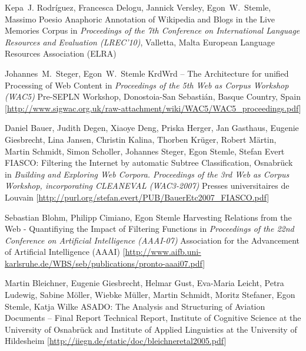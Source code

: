 \documentclass[11pt,a4paper]{moderncv}
\begin{document}
        {Kepa~J. Rodr{\'i}guez, Francesca Delogu, Jannick Versley,
        Egon~W.~Stemle, Massimo Poesio} {Anaphoric Annotation of Wikipedia
        and Blogs in the Live Memories Corpus}
        {\small in {\em Proceedings of the 7th Conference on International
        Language Resources and Evaluation (LREC'10)}, Valletta, Malta}
        {\small European Language Resources Association (ELRA)}
        {}

        {Johannes~M.~Steger, Egon~W.~Stemle}
        {{KrdWrd} -- The Architecture for unified Processing of Web Content}
        {\small in {\em Proceedings of the 5th Web as Corpus Workshop (WAC5)}}
        {\small Pre-SEPLN Workshop, Donostoia-San Sebasti{\'a}n, Basque
        Country, Spain}
        {[\url{http://www.sigwac.org.uk/raw-attachment/wiki/WAC5/WAC5_proceedings.pdf}]}

        {Daniel Bauer, Judith Degen, Xiaoye Deng, Priska Herger, Jan Gasthaus,
        Eugenie Giesbrecht, Lina Jansen, Christin Kalina, Thorben Kr{\"u}ger,
        Robert M{\"a}rtin, Martin Schmidt, Simon Scholler, Johannes Steger,
        Egon Stemle, Stefan Evert}
        {FIASCO: Filtering the Internet by automatic Subtree Classification,
        Osnabr{\"u}ck}
        {\small in {\em Building and Exploring Web Corpora. Proceedings of the
        3rd Web as Corpus Workshop, incorporating CLEANEVAL (WAC3-2007)}}
        {\small Presses universitaires de Louvain}
        {[\url{http://purl.org/stefan.evert/PUB/BauerEtc2007_FIASCO.pdf}]}
    
        {Sebastian Blohm, Philipp Cimiano, Egon Stemle}
        {Harvesting Relations from the Web - Quantifiying the Impact of
        Filtering Functions}
        {\small in {\em Proceedings of the 22nd Conference on Artificial
        Intelligence (AAAI-07)}}
        {\small Association for the Advancement of Artificial Intelligence
        (AAAI)}
        {[\url{http://www.aifb.uni-karlsruhe.de/WBS/seb/publications/pronto-aaai07.pdf}]}

        {Martin Bleichner, Eugenie Giesbrecht, Helmar Gust, Eva-Maria Leicht,
        Petra Ludewig, Sabine M{\"o}ller, Wiebke M{\"u}ller, Martin Schmidt,
        Moritz Stefaner, Egon Stemle, Katja Wilke}
        {ASADO: The Analysis and Structuring of Aviation Documents -- Final Report}
        {\small Technical Report, Institute of Cognitive Science at the
        University of Osnabr{\"u}ck and Institute of Applied Linguistics at the
        University of Hildesheim}
        {}
        {[\url{http://iiegn.de/static/doc/bleichneretal2005.pdf}]}
\end{document}
